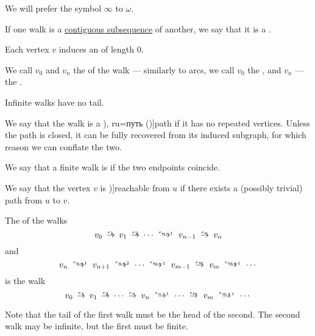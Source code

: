 \begin{definition}
\begin{thmenum}[resume=def:graph_walk]
    We will prefer the symbol \( \infty \) to \( \omega \).

     If one walk is a \hyperref[def:contiguous_subsequence]{contiguous subsequence} of another, we say that it is a .

     Each vertex \( v \) induces an  of length \( 0 \).

     We call \( v_0 \) and \( v_n \) the  of the walk --- similarly to arcs, we call \( v_0 \) the , and \( v_n \) --- the .

    Infinite walks have no tail.

     We say that the walk is a \term[bg=път (\cite[11]{Мирчев2001Графи}), ru=путь (\cite[278]{БелоусовТкачёв2004ДискретнаяМатематика})]{path} if it has no repeated vertices. Unless the path is closed, it can be fully recovered from its induced subgraph, for which reason we can conflate the two.

     We say that a finite walk is  if the two endpoints coincide.

     We say that the vertex \( v \) is \term[ru=достижимая (вершина) (\cite[278]{БелоусовТкачёв2004ДискретнаяМатематика})]{reachable} from \( u \) if there exists a (possibly trivial) path from \( u \) to \( v \).

     The  of the walks
    \begin{equation*}
      v_0 \reloset {e_1} \to v_1 \reloset {e_2} \to \cdots \reloset {e_{n-1}} \to v_{n-1} \reloset {e_n} \to v_n
    \end{equation*}
    and
    \begin{equation*}
      v_n \reloset {e_{n+1}} \to v_{n+1} \reloset {e_{n+2}} \to \cdots \reloset {e_{m-1}} \to v_{m-1} \reloset {e_m} \to v_m \reloset {e_{m+1}} \to \cdots
    \end{equation*}
    is the walk
    \begin{equation*}
      v_0 \reloset {e_1} \to v_1 \reloset {e_2} \to \cdots \reloset {e_n} \to v_n \reloset {e_{n+1}} \to \cdots \reloset {e_m} \to v_m  \reloset {e_{m+1}} \to \cdots
    \end{equation*}

    Note that the tail of the first walk must be the head of the second. The second walk may be infinite, but the first must be finite.
  \end{thmenum}
\end{definition}
